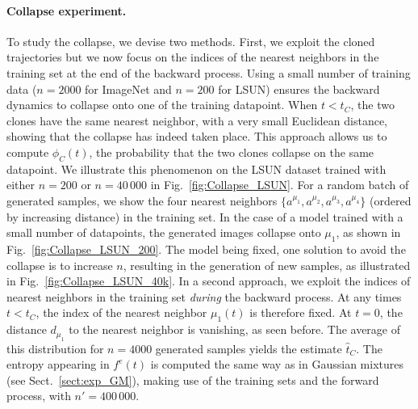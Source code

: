 \documentclass[10pt,twocolumn]{article}
\begin{document}
\paragraph*{Collapse experiment.} To study the collapse, we devise two methods. First, we exploit the cloned trajectories but we now focus on the indices of the nearest neighbors in the training set at the end of the backward process. Using a small number of training data ($n = 2000$ for ImageNet and $n = 200$ for LSUN) ensures the backward dynamics to collapse onto one of the training datapoint. When $t < t_C$, the two clones have the same nearest neighbor, with a very small Euclidean distance, showing that the collapse has indeed taken place. This approach allows us to compute $\phi_C(t)$, the probability that the two clones collapse on the same datapoint. We illustrate this phenomenon on the LSUN dataset trained with either $n=200$ or $n=40\,000$ in Fig.~\ref{fig:Collapse_LSUN}.
For a random batch of generated samples, we show the four nearest neighbors $\{a^{\mu_1}, a^{\mu_2}, a^{\mu_3}, a^{\mu_4}\}$ (ordered by increasing distance) in the training set. In the case of a model trained with a small number of datapoints, the generated images collapse onto $\mu_1$, as shown in Fig.~\ref{fig:Collapse_LSUN_200}. The model being fixed, one solution to avoid the collapse is to increase $n$, resulting in the generation of new samples, as illustrated in Fig.~\ref{fig:Collapse_LSUN_40k}.
In a second approach, we exploit the indices of nearest neighbors in the training set \emph{during} the backward process. At any times $t < t_C$, the index of the nearest neighbor $\mu_1(t)$ is therefore fixed. At $t=0$, the distance $d_{\mu_1}$ to the nearest neighbor is vanishing, as seen before. The average of this distribution for $n=4000$ generated samples yields the estimate $\hat{t}_C$.
The entropy appearing in $f^e(t)$ is computed the same way as in Gaussian mixtures (see Sect.~\ref{sect:exp_GM}), making use of the training sets and the forward process, with $n'=400\,000$.
\end{document}
